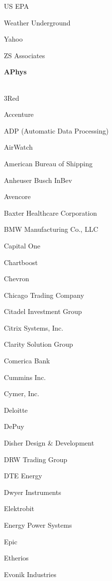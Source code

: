 \documentclass[twoside]{article}
\begin{document}
\begin{center}
\begin{multicols}{5}
\begin{FlushLeft}
\begin{compactitem}
\item US EPA
\item Weather Underground
\item Yahoo
\item ZS Associates
\end{compactitem}
        \end{FlushLeft}
        \vspace{1em}
        {\fontsize{14}{16}\selectfont \bf APhys}\\
        \vspace{-1em}
        ~\hrulefill~
        \vspace{-.9em}
        \begin{FlushLeft}
        \begin{compactitem}
        \item 3Red
\item Accenture
\item ADP (Automatic Data Processing)
\item AirWatch
\item American Bureau of Shipping
\item Anheuser Busch InBev
\item Avencore
\item Baxter Healthcare Corporation
\item BMW Manufacturing Co., LLC
\item Capital One
\item Chartboost
\item Chevron
\item Chicago Trading Company
\item Citadel Investment Group
\item Citrix Systems, Inc.
\item Clarity Solution Group
\item Comerica Bank
\item Cummins Inc.
\item Cymer, Inc.
\item Deloitte
\item DePuy
\item Disher Design \& Development
\item DRW Trading Group
\item DTE Energy
\item Dwyer Instruments
\item Elektrobit
\item Energy Power Systems
\item Epic
\item Etherios
\item Evonik Industries

\end{compactitem}
\end{FlushLeft}
\end{multicols}
\end{center}
\end{document}
